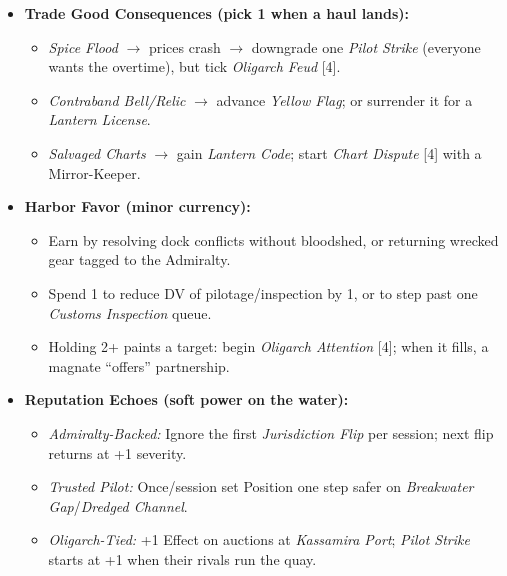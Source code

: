 \begin{itemize}
  \item \textbf{Trade Good Consequences (pick 1 when a haul lands):}
  \begin{itemize}
    \item \emph{Spice Flood} $\rightarrow$ prices crash $\rightarrow$ downgrade one \emph{Pilot Strike} (everyone wants the overtime), but tick \emph{Oligarch Feud} [4].
    \item \emph{Contraband Bell/Relic} $\rightarrow$ advance \emph{Yellow Flag}; or surrender it for a \emph{Lantern License}.
    \item \emph{Salvaged Charts} $\rightarrow$ gain \emph{Lantern Code}; start \emph{Chart Dispute} [4] with a Mirror-Keeper.
  \end{itemize}

  \item \textbf{Harbor Favor (minor currency):}
  \begin{itemize}
    \item Earn by resolving dock conflicts without bloodshed, or returning wrecked gear tagged to the Admiralty.
    \item Spend 1 to reduce DV of pilotage/inspection by 1, or to step past one \emph{Customs Inspection} queue.
    \item Holding 2+ paints a target: begin \emph{Oligarch Attention} [4]; when it fills, a magnate “offers” partnership.
  \end{itemize}

  \item \textbf{Reputation Echoes (soft power on the water):}
  \begin{itemize}
    \item \emph{Admiralty-Backed:} Ignore the first \emph{Jurisdiction Flip} per session; next flip returns at +1 severity.
    \item \emph{Trusted Pilot:} Once/session set Position one step safer on \emph{Breakwater Gap}/\emph{Dredged Channel}.
    \item \emph{Oligarch-Tied:} +1 Effect on auctions at \emph{Kassamira Port}; \emph{Pilot Strike} starts at +1 when their rivals run the quay.
  \end{itemize}
\end{itemize}

